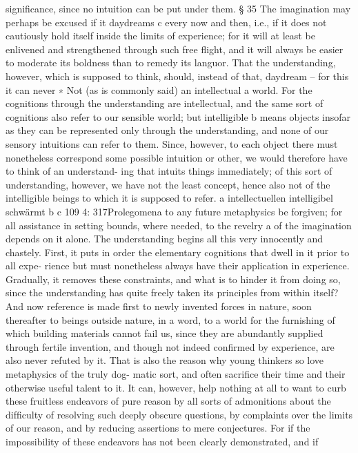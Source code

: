 signiﬁcance, since no intuition can be put under them.
§ 35
The imagination may perhaps be excused if it daydreams c every now
and then, i.e., if it does not cautiously hold itself inside the limits of
experience; for it will at least be enlivened and strengthened through
such free ﬂight, and it will always be easier to moderate its boldness
than to remedy its languor. That the understanding, however, which is
supposed to think, should, instead of that, daydream – for this it can never
∗ Not (as is commonly said) an intellectual a world. For the cognitions through the
understanding are intellectual, and the same sort of cognitions also refer to our
sensible world; but intelligible b means objects insofar as they can be represented
only through the understanding, and none of our sensory intuitions can refer to
them. Since, however, to each object there must nonetheless correspond some
possible intuition or other, we would therefore have to think of an understand-
ing that intuits things immediately; of this sort of understanding, however, we
have not the least concept, hence also not of the intelligible beings to which it is
supposed to refer.
a intellectuellen
intelligibel
schwärmt
b
c
109
4: 317Prolegomena to any future metaphysics
be forgiven; for all assistance in setting bounds, where needed, to the
revelry a of the imagination depends on it alone.
The understanding begins all this very innocently and chastely. First,
it puts in order the elementary cognitions that dwell in it prior to all expe-
rience but must nonetheless always have their application in experience.
Gradually, it removes these constraints, and what is to hinder it from
doing so, since the understanding has quite freely taken its principles
from within itself? And now reference is made ﬁrst to newly invented
forces in nature, soon thereafter to beings outside nature, in a word, to a
world for the furnishing of which building materials cannot fail us, since
they are abundantly supplied through fertile invention, and though not
indeed conﬁrmed by experience, are also never refuted by it. That is
also the reason why young thinkers so love metaphysics of the truly dog-
matic sort, and often sacriﬁce their time and their otherwise useful talent
to it.
It can, however, help nothing at all to want to curb these fruitless
endeavors of pure reason by all sorts of admonitions about the difﬁculty
of resolving such deeply obscure questions, by complaints over the limits
of our reason, and by reducing assertions to mere conjectures. For if the
impossibility of these endeavors has not been clearly demonstrated, and if
